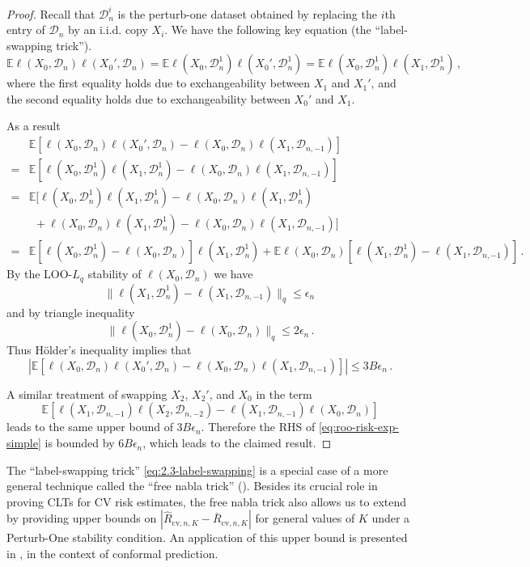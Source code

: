 \documentclass[11pt]{article}
\theoremstyle{plain}
\newcommand{\cv}{{\mathrm{cv}}}
\newcommand{\D}{{\mathcal{D}}}
\begin{document}
\begin{proof}
Recall that $\D_n^i$ is the perturb-one dataset obtained by replacing the $i$th entry of $\D_n$ by an i.i.d. copy $X_i$. We have the following key equation (the ``label-swapping trick'').
\begin{equation}\label{eq:2.3-label-swapping}\mathbb E\ell(X_0,\D_n)\ell(X_0',\D_n)=\mathbb E\ell(X_0,\D_{n}^1)\ell(X_0',\D_{n}^1)=\mathbb E \ell(X_0,\D_{n}^1)\ell(X_1,\D_{n}^1)\,,\end{equation}
where the first equality holds due to exchangeability between $X_1$ and $X_1'$, and the second equality holds due to exchangeability between $X_0'$ and $X_1$.

As a result
\begin{align*}
   & \mathbb E\left[\ell(X_0,\D_n)\ell(X_0',\D_n)-\ell(X_0,\D_n)\ell(X_1,\D_{n,-1})\right]\\
   = & \mathbb E\left[\ell(X_0,\D_n^1)\ell(X_1,\D_n^1)-\ell(X_0,\D_n)\ell(X_1,\D_{n,-1})\right]\\
   = &\mathbb E\big[\ell(X_0,\D_n^1)\ell(X_1,\D_n^1)-\ell(X_0,\D_n)\ell(X_1,\D_n^1)\\
   &~~+\ell(X_0,\D_n)\ell(X_1,\D_n^1)-\ell(X_0,\D_n)\ell(X_1,\D_{n,-1})\big]\\
   = & \mathbb E\left[\ell(X_0,\D_n^1)-\ell(X_0,\D_n)\right]\ell(X_1,\D_n^1)+\mathbb E\ell(X_0,\D_n)\left[\ell(X_1,\D_n^1)-\ell(X_1,\D_{n,-1})\right]\,.
\end{align*}
By the LOO-$L_q$ stability of $\ell(X_0,\D_n)$ we have
$$\|\ell(X_1,\D_n^1)-\ell(X_1,\D_{n,-1})\|_q\le \epsilon_n\,$$
and by triangle inequality
$$
\|\ell(X_0,\D_n^1)-\ell(X_0,\D_n)\|_q\le 2\epsilon_n\,.
$$
Thus H\"{o}lder's inequality implies that
$$\left|\mathbb E\left[\ell(X_0,\D_n)\ell(X_0',\D_n)-\ell(X_0,\D_n)\ell(X_1,\D_{n,-1})\right]\right|\le 3 B\epsilon_n\,.$$

A similar treatment of swapping $X_2$, $X_2'$, and $X_0$ in the term 
$$\mathbb E \left[\ell(X_1,\D_{n,-1})\ell(X_2,\D_{n,-2})-\ell(X_1,\D_{n,-1})\ell(X_0,\D_n)\right]$$
leads to the same upper bound of $3B\epsilon_n$. Therefore the RHS of \eqref{eq:roo-risk-exp-simple} is bounded by $6B\epsilon_n$, which leads to the claimed result.
\end{proof}

The ``label-swapping trick'' \eqref{eq:2.3-label-swapping} is a special case of a more general technique called the ``free nabla trick'' ().  Besides its crucial role in proving CLTs for CV risk estimates, the free nabla trick also allows us to extend  by providing upper bounds on $|\hat R_{\cv,n,K}-\bar R_{\cv,n,K}|$ for general values of $K$ under a Perturb-One stability condition.  An application of this upper bound is presented in , in the context of conformal prediction.
\end{document}
